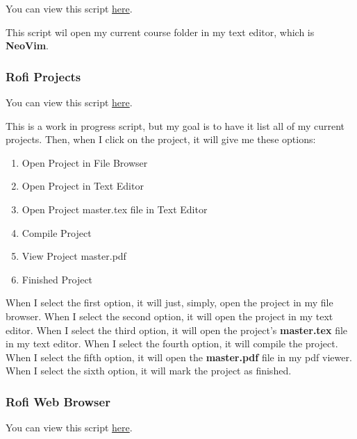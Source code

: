 You can view this script
\hyperlink{https://github.com/SingularisArt/local/blob/master/scripts/school/rofi-nvim.sh}{here}.

This script wil open my current course folder in my text editor, which is
\textbf{NeoVim}.


\subsubsection{Rofi Projects}
\label{sub_sub_sec:rofi_projects}

You can view this script
\hyperlink{https://github.com/SingularisArt/local/blob/master/scripts/school/rofi-projects.py}{here}.

This is a work in progress script, but my goal is to have it list all of my
current projects. Then, when I click on the project, it will give me these
options:

\begin{enumerate}
  \item Open Project in File Browser
  \item Open Project in Text Editor
  \item Open Project master.tex file in Text Editor
  \item Compile Project
  \item View Project master.pdf
  \item Finished Project
\end{enumerate}

When I select the first option, it will just, simply, open the project in my
file browser. When I select the second option, it will open the project in my
text editor. When I select the third option, it will open the project's
\textbf{master.tex} file in my text editor. When I select the fourth option, it
will compile the project. When I select the fifth option, it will open the
\textbf{master.pdf} file in my pdf viewer. When I select the sixth option, it
will mark the project as finished.


\subsubsection{Rofi Web Browser}
\label{sub_sub_sec:rofi_web_browser}

You can view this script
\hyperlink{https://github.com/SingularisArt/local/blob/master/scripts/school/rofi-web-browser.sh}{here}.

